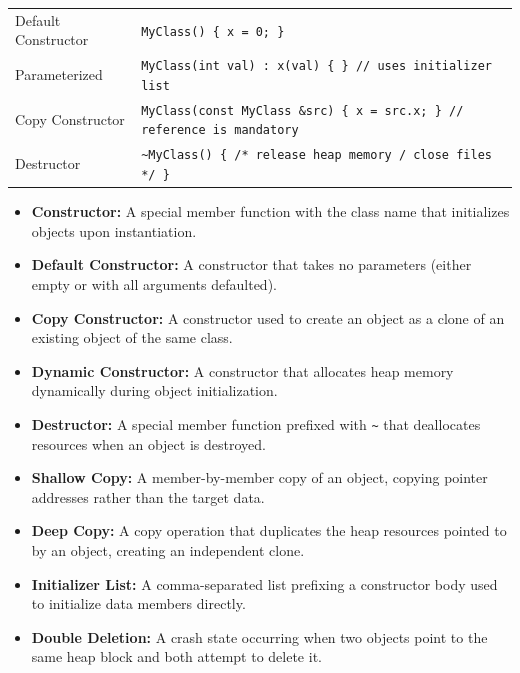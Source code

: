 \documentclass[12pt,a4paper]{article}
\renewcommand{\arraystretch}{1.45}
\begin{document}
\begin{tcolorbox}[formulabox, title={\textbf{Key Constructor Syntax}}]
\renewcommand{\arraystretch}{1.3}
\begin{tabularx}{\linewidth}{B{3.8cm} X}
Default Constructor      & \texttt{MyClass() \{ x = 0; \}} \\[4pt]
Parameterized            & \texttt{MyClass(int val) : x(val) \{ \} // uses initializer list} \\[4pt]
Copy Constructor         & \texttt{MyClass(const MyClass \&src) \{ x = src.x; \} // reference is mandatory} \\[4pt]
Destructor               & \texttt{\textasciitilde MyClass() \{ /* release heap memory / close files */ \}}
\end{tabularx}
\end{tcolorbox}

\begin{tcolorbox}[defbox, title={\textbf{One-Line Definitions}}]
\begin{itemize}[leftmargin=*, itemsep=2.5pt, topsep=0pt]
  \item \textbf{Constructor:} A special member function with the class name that initializes objects upon instantiation.
  \item \textbf{Default Constructor:} A constructor that takes no parameters (either empty or with all arguments defaulted).
  \item \textbf{Copy Constructor:} A constructor used to create an object as a clone of an existing object of the same class.
  \item \textbf{Dynamic Constructor:} A constructor that allocates heap memory dynamically during object initialization.
  \item \textbf{Destructor:} A special member function prefixed with \texttt{\textasciitilde} that deallocates resources when an object is destroyed.
  \item \textbf{Shallow Copy:} A member-by-member copy of an object, copying pointer addresses rather than the target data.
  \item \textbf{Deep Copy:} A copy operation that duplicates the heap resources pointed to by an object, creating an independent clone.
  \item \textbf{Initializer List:} A comma-separated list prefixing a constructor body used to initialize data members directly.
  \item \textbf{Double Deletion:} A crash state occurring when two objects point to the same heap block and both attempt to delete it.
\end{itemize}
\end{tcolorbox}
\end{document}
